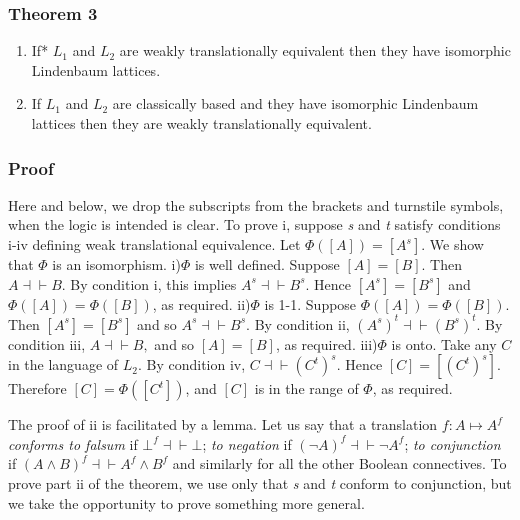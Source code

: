 \documentclass[
  11pt,
  letterpaper,
  DIV=11,
  numbers=noendperiod,
  twoside]{scrartcl}
\providecommand{\tightlist}{%
  \setlength{\itemsep}{0pt}\setlength{\parskip}{0pt}}
\begin{document}
\subsubsection*{Theorem 3}\label{theorem-3}

\begin{enumerate}
\def\labelenumi{\roman{enumi}.}
\tightlist
\item
  If* \(L_1\) and \(L_2\) are weakly translationally equivalent then
  they have isomorphic Lindenbaum lattices.
\item
  If \(L_1\) and \(L_2\) are classically based and they have isomorphic
  Lindenbaum lattices then they are weakly translationally equivalent.
\end{enumerate}

\subsubsection*{Proof}\label{proof-2}

Here and below, we drop the subscripts from the brackets and turnstile
symbols, when the logic is intended is clear. To prove i, suppose
\emph{s} and \emph{t} satisfy conditions i-iv defining weak
translational equivalence. Let \(\Phi([A])=[A^s]\). We show that
\(\Phi\) is an isomorphism. i)\(\Phi\) is well defined. Suppose
\([A]=[B]\). Then \(A{\dashv}{\vdash}B\). By condition i, this implies
\(A^s{\dashv}{\vdash}B^s\). Hence \([A^s] = [B^s]\) and
\(\Phi([A])=\Phi([B])\), as required. ii)\(\Phi\) is 1-1. Suppose
\(\Phi([A])=\Phi([B])\). Then \([A^s]=[B^s]\) and so
\(A^s{\dashv}{\vdash}B^s\). By condition ii,
\((A^s)^t{\dashv}{\vdash}(B^s)^t\). By condition iii,
\(A{\dashv}{\vdash}B,\) and so \([A]=[B]\), as required. iii)\(\Phi\) is
onto. Take any \(C\) in the language of \(L_2\). By condition iv,
\(C{\dashv}{\vdash}(C^t)^s\). Hence \([C] = [(C^t)^s]\). Therefore
\([C]=\Phi([C^t])\), and \([C]\) is in the range of \(\Phi\), as
required.

The proof of ii is facilitated by a lemma. Let us say that a translation
\(f\colon A{\mapsto}A^f\) \emph{conforms to falsum} if
\(\bot^f {\dashv}{\vdash} \bot\); \emph{to negation} if
\((\neg A)^f {\dashv}{\vdash} \neg A^f\); \emph{to conjunction} if
\((A\wedge B)^f {\dashv}{\vdash}A^f \wedge B^f\) and similarly for all
the other Boolean connectives. To prove part ii of the theorem, we use
only that \emph{s} and \emph{t} conform to conjunction, but we take the
opportunity to prove something more general.
\end{document}
